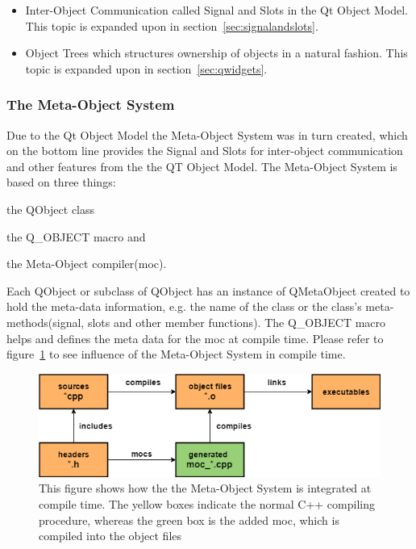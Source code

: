 \begin{itemize}
\item Inter-Object Communication called Signal and Slots in the Qt Object Model. This topic is expanded upon in section~\ref{sec:signalandslots}.
\item Object Trees which structures ownership of objects in a natural fashion. This topic is expanded upon in section~\ref{sec:qwidgets}.
\end{itemize}

\subsubsection{The Meta-Object System}
\label{sec:TheMetaObjectSystem}
Due to the Qt Object Model the Meta-Object System was in turn created, which on the bottom line provides the Signal and Slots for inter-object communication and other features from the the QT Object Model. The Meta-Object System is based on three things:
\begin{enumerate*}[label={\alph*)},font={\color{red!50!black}\bfseries}]
\item the QObject class
\item the Q\_OBJECT macro and
\item the Meta-Object compiler(moc).
\end{enumerate*}
Each QObject or subclass of QObject has an instance of QMetaObject created to hold the meta-data information, e.g. the name of the class or the class's meta-methods(signal, slots and other member functions). The Q\_OBJECT macro helps and defines the meta data for the moc at compile time. Please refer to figure~\ref{fig:QtC++BuildProcess} to see influence of the Meta-Object System in compile time.

\begin{figure}[h]
	\centering
	\includegraphics[scale=0.55]{Figures/QtC++BuildProcess.png}
	\caption{This figure shows how the the Meta-Object System is integrated at compile time. The yellow boxes indicate the normal C++ compiling procedure, whereas the green box is the added moc, which is compiled into the object files}
	\label{fig:QtC++BuildProcess}
\end{figure}

